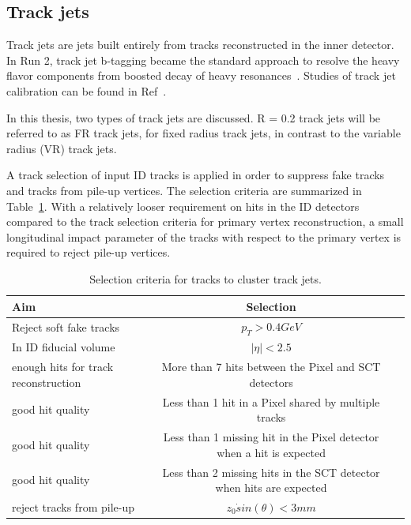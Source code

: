 \subsection{Track jets}
\label{sec:track}

\par Track jets are jets built entirely from tracks reconstructed in the inner detector. In Run 2, track jet b-tagging became the standard approach to resolve the heavy flavor components from boosted decay of heavy resonances~\cite{ATL-PHYS-PUB-2015-035,ATLAS-CONF-2016-039}. Studies of track jet calibration can be found in Ref~\cite{VanDenWollenberg:1981533}. 
\par In this thesis, two types of track jets are discussed. R = 0.2 track jets will be referred to as FR track jets, for fixed radius track jets, in contrast to the variable radius (VR) track jets.

\par A track selection of input ID tracks is applied in order to suppress fake tracks and tracks from pile-up vertices. The selection criteria are summarized in Table~\ref{tab:trk}. With a relatively looser requirement on hits in the ID detectors compared to the track selection criteria for primary vertex reconstruction, a small longitudinal impact parameter of the tracks with respect to the primary vertex is required to reject pile-up vertices.

\begin{table}
    \centering
    \scriptsize
    \begin{tabular}{|l|c|c}
        \hline
        Aim & Selection \\
        \hline
        Reject soft fake tracks &$p_T> 0.4 GeV$ \\
        \hline
        In ID fiducial volume &$|\eta| < 2.5$\\
        \hline
        enough hits for track reconstruction & More than 7 hits between the Pixel and SCT detectors \\
        \hline
        good hit quality& Less than 1 hit in a Pixel shared by multiple tracks\\
        \hline
        good hit quality&Less than 1 missing hit in the Pixel detector when a hit is expected\\
        \hline
        good hit quality&Less than 2 missing hits in the SCT detector when hits are expected\\
        \hline
        reject tracks from pile-up & $z_0 \dot sin(\theta) < 3 mm$\\
        \hline
    \end{tabular}
    \caption{Selection criteria for tracks to cluster track jets. }
    \label{tab:trk}
\end{table}

